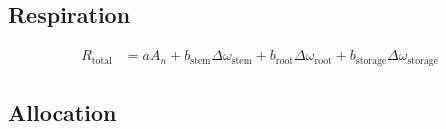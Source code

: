 \documentclass[10pt]{article}
\begin{document}
\subsection*{Respiration}
\begin{align}
  R_{\text{total}} &= a A_n + b_{\text{stem}}\Delta\omega_{\text{stem}} + b_{\text{root}}\Delta \omega_{\text{root}} + b_\text{storage}\Delta \omega_\text{storage} \label{eqn:Rtotal} 
\end{align}


\subsection*{Allocation}
\end{document}
